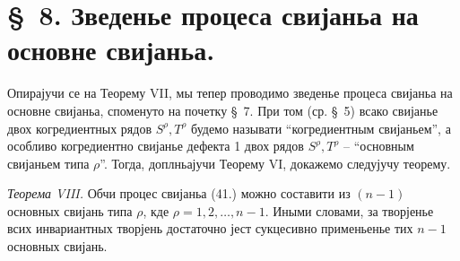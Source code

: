 ﻿\documentclass[11pt]{article}
\begin{document}
\section*{\S\ 8. Зведенье процеса свијаньа на основне свијаньа.}

Опирајучи се на Теорему VII, мы тепер проводимо зведенье процеса свијаньа на основне свијаньа, споменуто на почетку \S\ 7. При том (ср. \S\ 5) всако свијанье двох когредиентных рядов $S^\rho,T^\rho$ будемо называти ``когредиентным свијаньем'', а особливо когредиентно свијанье дефекта 1 двох рядов $S^\rho,T^\rho$ -- ``основным свијаньем типа $\rho$''. Тогда, доплньајучи Теорему VI, докажемо следујучу теорему.

\emph{Теорема VIII.} Обчи процес свијаньа (41.) можно составити из $(n-1)$ основных свијань типа $\rho$, кде $\rho=1,2,\ldots,n-1$. Иными словами, за творјенье всих инвариантных творјень достаточно јест сукцесивно применьенье тих $n-1$ основных свијань.
\end{document}
